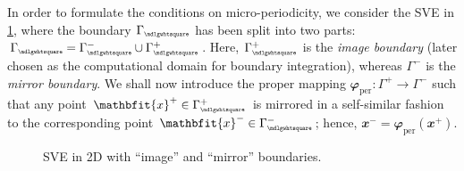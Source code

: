 \documentclass[12pt,a4paper]{article}
\renewcommand{\ta}[1]{\mathbfit{#1}}
\renewcommand{\Box}{\mdlgwhtsquare}
\newcommand{\per}{\mathrm{per}}
\newcommand{\rve}{
  {\mathchoice
   {\mbox{\scalebox{0.67}{$\Box$}}}
   {\mbox{\scalebox{0.67}{$\Box$}}}
   {\mbox{\scalebox{0.5}{$\Box$}}}
   {\mbox{\scalebox{0.375}{$\Box$}}}
  }
}
\begin{document}
In order to formulate the conditions on micro-periodicity, we consider the SVE in \cref{Figure2}, where the boundary $\Gamma_\rve$ has been split into two parts: $\Gamma_\rve=\Gamma_\rve^- \cup \Gamma_\rve^+$.
Here, $\Gamma_\rve^+$ is the \emph{image boundary} (later chosen as the computational domain for boundary integration), whereas $\Gamma^-$ is the \emph{mirror boundary}.
We shall now introduce the proper mapping $\ta{\varphi}_\per:\Gamma^+ \rightarrow \Gamma^-$ such that any point $\ta{x}^+\in\Gamma_\rve^+$ is mirrored in a self-similar fashion to the corresponding point $\ta{x}^-\in\Gamma_\rve^-$; hence, $\ta{x}^-=\ta{\varphi}_\per(\ta{x}^+)$.
\begin{figure}[H]
\centering
{}
\caption{SVE in 2D with ``image'' and ``mirror'' boundaries.}
\label{Figure2}
\end{figure}
\end{document}
